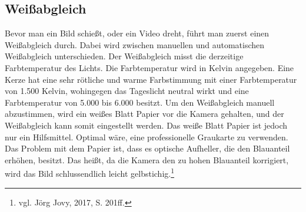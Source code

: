 \subsection{Weißabgleich}
Bevor man ein Bild schießt, oder ein Video dreht, führt man zuerst einen Weißabgleich durch. Dabei wird zwischen manuellen und automatischen Weißabgleich unterschieden. Der Weißabgleich misst die derzeitige Farbtemperatur des Lichts. Die Farbtemperatur wird in Kelvin angegeben. Eine Kerze hat eine sehr rötliche und warme Farbstimmung mit einer Farbtemperatur von 1.500 Kelvin, wohingegen das Tageslicht neutral wirkt und eine Farbtemperatur von 5.000 bis 6.000 besitzt. Um den Weißabgleich manuell abzustimmen, wird ein weißes Blatt Papier vor die Kamera gehalten, und der Weißabgleich kann somit eingestellt werden. Das weiße Blatt Papier ist jedoch nur ein Hilfsmittel. Optimal wäre, eine professionelle Graukarte zu verwenden. Das Problem mit dem Papier ist, dass es optische Aufheller, die den Blauanteil erhöhen, besitzt. Das heißt, da die Kamera den zu hohen Blauanteil korrigiert, wird das Bild schlussendlich leicht gelbstichig.\footnote{\label{}vgl. Jörg Jovy, 2017, S. 201ff.}
